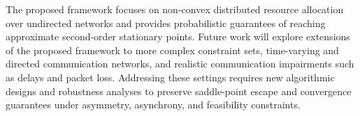 \documentclass{siamart251216}
\begin{document}
The proposed framework focuses on non-convex distributed resource allocation over undirected networks and provides probabilistic guarantees of reaching approximate second-order stationary points. Future work will explore extensions of the proposed framework to more complex constraint sets, time-varying and directed communication networks, and realistic communication impairments such as delays and packet loss. Addressing these settings requires new algorithmic designs and robustness analyses to preserve saddle-point escape and convergence guarantees under asymmetry, asynchrony, and feasibility constraints.




\end{document}
